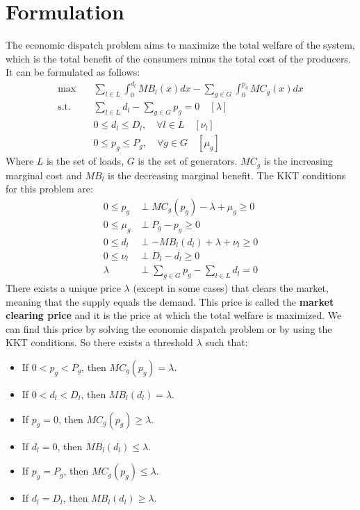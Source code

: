 \documentclass[12pt, openany]{report}
\theoremstyle{definition}
\begin{document}
\section{Formulation}
The economic dispatch problem aims to maximize the total welfare of the system, which is the total benefit of the consumers minus the total cost of the producers. It can be formulated as follows:
\begin{equation}
    \begin{aligned}
        \max \quad & \sum_{l \in L} \int_{0}^{d_l} MB_l(x)dx - \sum_{g \in G} \int_{0}^{p_g} MC_g(x)dx \\
        \text{s.t.} \quad & \sum_{l \in L} d_l - \sum_{g \in G} p_g = 0 \quad [\lambda]\\
        & 0 \leq d_l \leq D_l, \quad \forall l \in L \quad [\nu_l]\\
        & 0 \leq p_g \leq P_g, \quad \forall g \in G \quad [\mu_g]
    \end{aligned}
\end{equation}
Where $L$ is the set of loads, $G$ is the set of generators. $MC_g$ is the increasing marginal cost and $MB_l$ is the decreasing marginal benefit. The KKT conditions for this problem are:
\begin{equation}
    \begin{aligned}
        0 \leq p_g &\perp MC_g(p_g) - \lambda + \mu_g \geq 0\\
        0 \leq \mu_g &\perp P_g - p_g \geq 0\\
        0 \leq d_l &\perp -MB_l(d_l) + \lambda + \nu_l \geq 0\\
        0 \leq \nu_l &\perp D_l - d_l \geq 0\\
        \lambda &\perp \sum_{g \in G} p_g - \sum_{l \in L} d_l = 0 
    \end{aligned}
\end{equation}
There exists a unique price $\lambda$ (except in some cases) that clears the market, meaning that the supply equals the demand. This price is called the \textbf{market clearing price} and it is the price at which the total welfare is maximized. We can find this price by solving the economic dispatch problem or by using the KKT conditions. So there exists a threshold $\lambda$ such that:
\begin{itemize}
    \item If $0 < p_g < P_g$, then $MC_g(p_g) = \lambda$.
    \item If $0 < d_l < D_l$, then $MB_l(d_l) = \lambda$.
    \item If $p_g = 0$, then $MC_g(p_g) \geq \lambda$.
    \item If $d_l = 0$, then $MB_l(d_l) \leq \lambda$.
    \item If $p_g = P_g$, then $MC_g(p_g) \leq \lambda$.
    \item If $d_l = D_l$, then $MB_l(d_l) \geq \lambda$.
\end{itemize}
\end{document}

